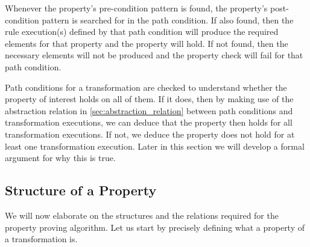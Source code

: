 Whenever the property's pre-condition pattern is found, the property's
post-condition pattern is searched for in the path condition. If
also found, then the rule execution(s) defined by that path condition will produce
the required elements for that property and the property will hold. If not
found, then the necessary elements will not be produced and the property check
will fail for that path condition.

Path conditions for a transformation are checked to understand whether the property of interest holds on all of them. If it does, then by making use of the abstraction relation in \cref{sec:abstraction_relation} between path conditions and transformation executions, we can deduce that the property then holds for all transformation executions. If not, we deduce the property does not hold for at least one transformation execution. Later in this section we will develop a formal argument for why this is true.

\subsection{Structure of a Property}
We will now elaborate on the structures and the relations required for the property proving algorithm. Let us start by precisely defining what a property of a transformation is. 


